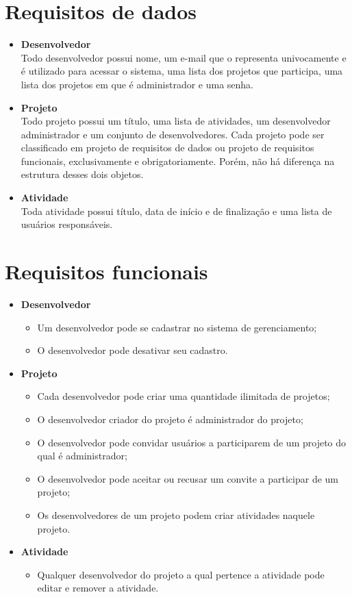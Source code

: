 \documentclass{article}
\begin{document}
\section{Requisitos de dados}
\begin{itemize}
    \item \textbf{Desenvolvedor}
    \\ Todo desenvolvedor possui nome, um e-mail que o representa univocamente e é utilizado para acessar o sistema, uma lista dos projetos que participa, uma lista dos projetos em que é administrador e uma senha.
    \item \textbf{Projeto}
    \\Todo projeto possui um título, uma lista de atividades, um desenvolvedor administrador e um conjunto de desenvolvedores. Cada projeto pode ser classificado em projeto de requisitos de dados ou projeto de requisitos funcionais, exclusivamente e obrigatoriamente. Porém, não há diferença na estrutura desses dois objetos.
    \item \textbf{Atividade}
    \\Toda atividade possui título, data de início e de finalização e uma lista de usuários responsáveis.
\end{itemize}
\section{Requisitos funcionais}
\begin{itemize}
    \item \textbf{Desenvolvedor}
    \begin{itemize}
        \item Um desenvolvedor pode se cadastrar no sistema de gerenciamento;
        \item O desenvolvedor pode desativar seu cadastro.
    \end{itemize}
    \item \textbf{Projeto}
    \begin{itemize}
        \item Cada desenvolvedor pode criar uma quantidade ilimitada de projetos;
        \item O desenvolvedor criador do projeto é administrador do projeto;
        \item O desenvolvedor pode convidar usuários a participarem de um projeto do qual é administrador;
        \item O desenvolvedor pode aceitar ou recusar um convite a participar de um projeto;
        \item Os desenvolvedores de um projeto podem criar atividades naquele projeto.
    \end{itemize}
    \item \textbf{Atividade}
    \begin{itemize}
        \item Qualquer desenvolvedor do projeto a qual pertence a atividade pode editar e remover a atividade.
    \end{itemize}
\end{itemize}
\end{document}
